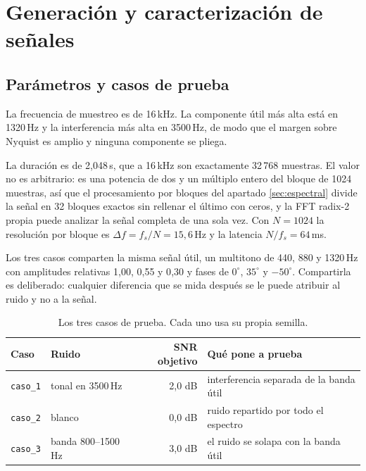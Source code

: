 
\section{Generación y caracterización de señales}
\label{sec:senales}

\subsection{Parámetros y casos de prueba}

La frecuencia de muestreo es de 16\,kHz. La componente útil más alta está en
1320\,Hz y la interferencia más alta en 3500\,Hz, de modo que el margen sobre
Nyquist es amplio y ninguna componente se pliega.

La duración es de 2,048\,s, que a 16\,kHz son exactamente 32\,768 muestras. El
valor no es arbitrario: es una potencia de dos y un múltiplo entero del bloque
de 1024 muestras, así que el procesamiento por bloques del apartado
\ref{sec:espectral} divide la señal en 32 bloques exactos sin rellenar el
último con ceros, y la FFT radix-2 propia puede analizar la señal completa de
una sola vez. Con $N=1024$ la resolución por bloque es
$\Delta f = f_s/N = 15{,}6$\,Hz y la latencia $N/f_s = 64$\,ms.

Los tres casos comparten la misma señal útil, un multitono de 440, 880 y
1320\,Hz con amplitudes relativas 1{,}00, 0{,}55 y 0{,}30 y fases de
$0^\circ$, $35^\circ$ y $-50^\circ$. Compartirla es deliberado: cualquier
diferencia que se mida después se le puede atribuir al ruido y no a la señal.

\begin{table}[H]
\centering\small
\caption{Los tres casos de prueba. Cada uno usa su propia semilla.}
\begin{tabular}{llrl}
\toprule
Caso & Ruido & SNR objetivo & Qué pone a prueba \\
\midrule
\texttt{caso\_1} & tonal en 3500\,Hz        & 2,0 dB & interferencia separada de la banda útil \\
\texttt{caso\_2} & blanco                   & 0,0 dB & ruido repartido por todo el espectro \\
\texttt{caso\_3} & banda 800--1500\,Hz      & 3,0 dB & el ruido se solapa con la banda útil \\
\bottomrule
\end{tabular}
\end{table}

